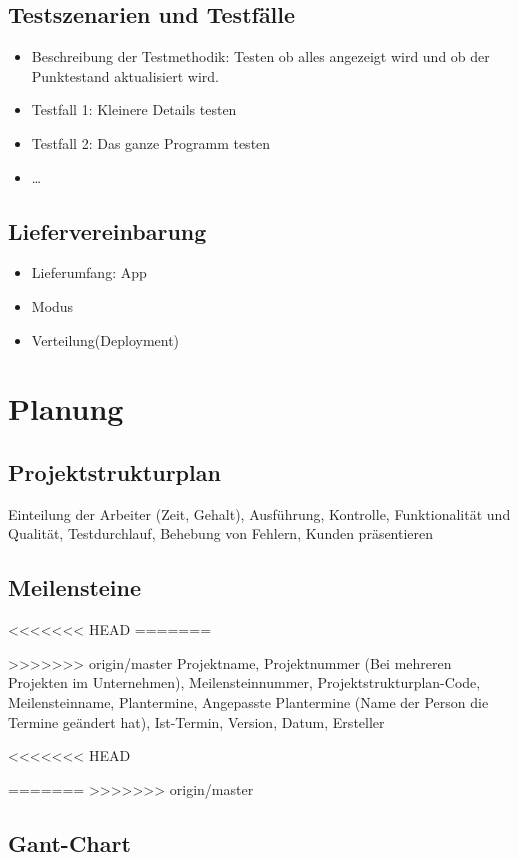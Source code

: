 \subsection{Testszenarien und Testfälle}
\begin{itemize}
	\item Beschreibung der Testmethodik:
	Testen ob alles angezeigt wird und ob der Punktestand aktualisiert wird.
	\item Testfall 1:
	Kleinere Details testen
	\item Testfall 2:
	Das ganze Programm testen
	\item \ldots
\end{itemize}
\subsection{Liefervereinbarung}
\begin{itemize}
	\item Lieferumfang: App
	\item Modus
	\item Verteilung(Deployment)
\end{itemize}
\section{Planung}
\subsection{Projektstrukturplan}

Einteilung der Arbeiter (Zeit, Gehalt), Ausführung, Kontrolle, Funktionalität und Qualität, Testdurchlauf, Behebung von Fehlern, Kunden präsentieren 
\subsection{Meilensteine}
<<<<<<< HEAD
=======

>>>>>>> origin/master
Projektname,
Projektnummer (Bei mehreren Projekten im Unternehmen),
Meilensteinnummer,
Projektstrukturplan-Code,
Meilensteinname,
Plantermine,
Angepasste Plantermine (Name der Person die Termine geändert hat),
Ist-Termin,
Version, Datum, Ersteller

<<<<<<< HEAD

=======
>>>>>>> origin/master
\subsection{Gant-Chart}

